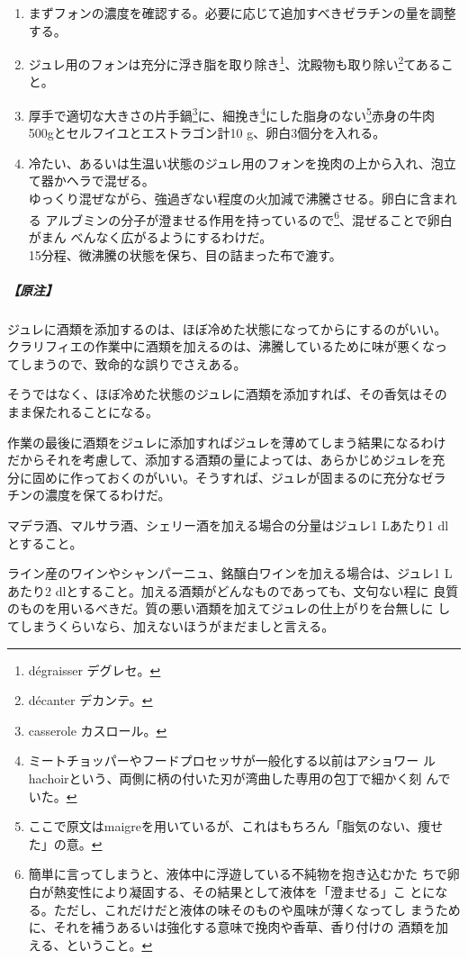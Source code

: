 \begin{recette}
\begin{enumerate}
\def\labelenumi{\arabic{enumi}.}
\item
  まずフォンの濃度を確認する。必要に応じて追加すべきゼラチンの量を調整する。
\item
  ジュレ用のフォンは充分に浮き脂を取り除き\footnote{dégraisser
    デグレセ。}、沈殿物も取り除い\footnote{décanter デカンテ。}てあること。
\item
  厚手で適切な大きさの片手鍋\footnote{casserole カスロール。}に、細挽き\footnote{ミートチョッパーやフードプロセッサが一般化する以前はアショワー
    ルhachoirという、両側に柄の付いた刃が湾曲した専用の包丁で細かく刻
    んでいた。}にした脂身のない\footnote{ここで原文はmaigreを用いているが、これはもちろん「脂気のない、痩せた」の意。}赤身の牛肉
  500gとセルフイユとエストラゴン計10 g、卵白3個分を入れる。
\item
  冷たい、あるいは生温い状態のジュレ用のフォンを挽肉の上から入れ、泡立て器かヘラで混ぜる。\\
  ゆっくり混ぜながら、強過ぎない程度の火加減で沸騰させる。卵白に含まれる
  アルブミンの分子が澄ませる作用を持っているので\footnote{簡単に言ってしまうと、液体中に浮遊している不純物を抱き込むかた
    ちで卵白が熱変性により凝固する、その結果として液体を「澄ませる」こ
    とになる。ただし、これだけだと液体の味そのものや風味が薄くなってし
    まうために、それを補うあるいは強化する意味で挽肉や香草、香り付けの
    酒類を加える、ということ。}、混ぜることで卵白がまん
  べんなく広がるようにするわけだ。\\
  15分程、微沸騰の状態を保ち、目の詰まった布で漉す。
\end{enumerate}

\hypertarget{ux539fux6ce8}{%
\subparagraph{【原注】}\label{ux539fux6ce8}}

ジュレに酒類を添加するのは、ほぼ冷めた状態になってからにするのがいい。
クラリフィエの作業中に酒類を加えるのは、沸騰しているために味が悪くなっ
てしまうので、致命的な誤りでさえある。

そうではなく、ほぼ冷めた状態のジュレに酒類を添加すれば、その香気はその
まま保たれることになる。

作業の最後に酒類をジュレに添加すればジュレを薄めてしまう結果になるわけ
だからそれを考慮して、添加する酒類の量によっては、あらかじめジュレを充
分に固めに作っておくのがいい。そうすれば、ジュレが固まるのに充分なゼラ
チンの濃度を保てるわけだ。

マデラ酒、マルサラ酒、シェリー酒を加える場合の分量はジュレ1 Lあたり1
dlとすること。

ライン産のワインやシャンパーニュ、銘醸白ワインを加える場合は、ジュレ1
Lあたり2 dlとすること。加える酒類がどんなものであっても、文句ない程に
良質のものを用いるべきだ。質の悪い酒類を加えてジュレの仕上がりを台無しに
してしまうくらいなら、加えないほうがまだましと言える。


\end{recette}
